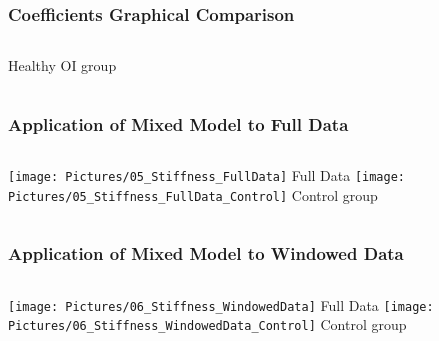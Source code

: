 \documentclass[xcolor=table]{beamer}
\begin{document}

\begin{frame}
	\frametitle{Coefficients Graphical Comparison}
	\begin{columns}[c]
		\centering
		\vfill
		Healthy
		\vfill
		\centering
		\vfill
		OI group
		\vfill
	\end{columns}
\end{frame}


\begin{frame}
	\frametitle{Application of Mixed Model to Full Data}
	\begin{columns}[c]
		\centering
		\vfill
		\texttt{[image: Pictures/05\_Stiffness\_FullData]}
		Full Data
		\vfill
		\centering
		\vfill
		\texttt{[image: Pictures/05\_Stiffness\_FullData\_Control]}
		Control group
		\vfill
	\end{columns}
\end{frame}


\begin{frame}
	\frametitle{Application of Mixed Model to Windowed Data}
	\begin{columns}[c]
		\centering
		\vfill
		\texttt{[image: Pictures/06\_Stiffness\_WindowedData]}
		Full Data
		\vfill
		\centering
		\vfill
		\texttt{[image: Pictures/06\_Stiffness\_WindowedData\_Control]}
		Control group
		\vfill
	\end{columns}
\end{frame}

\end{document}
